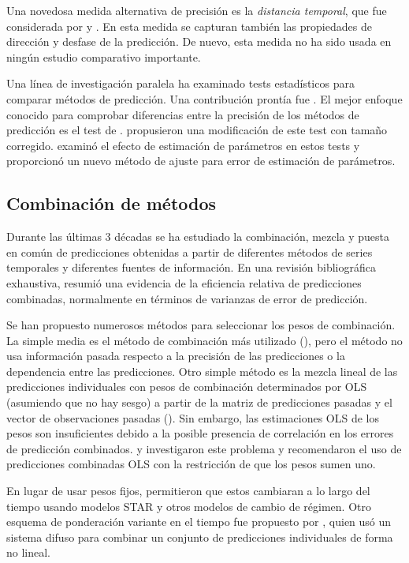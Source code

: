 \documentclass{llncs}
\begin{document}
Una novedosa medida alternativa de precisión es la \emph{distancia temporal}, que fue considerada por \cite{Granger2003199} y \cite{Granger2003339}. En esta medida se capturan también  las propiedades de dirección y desfase de la predicción. De nuevo, esta medida no ha sido usada en ningún estudio comparativo importante.

Una línea de investigación paralela ha examinado tests estadísticos para comparar métodos de predicción. Una contribución prontía fue \cite{Flores1989529}. El mejor enfoque conocido para comprobar diferencias entre la precisión de los métodos de predicción es el test de \cite{Diebold1995253}. \cite{Harvey1997281} propusieron una modificación de este test con tamaño corregido. \cite{McCracken2004503} examinó el efecto de estimación de parámetros en estos tests y proporcionó un nuevo método de ajuste para error de estimación de parámetros.


\subsection{Combinación de métodos}
Durante las últimas 3 décadas se ha estudiado la combinación, mezcla y puesta en común de predicciones obtenidas a partir de diferentes métodos de series temporales y diferentes fuentes de información. En una revisión bibliográfica exhaustiva, \cite{Clemen1989559} resumió una evidencia de la eficiencia relativa de predicciones combinadas, normalmente en términos de varianzas de error de predicción.

Se han propuesto numerosos métodos para seleccionar los pesos de combinación. La simple media es el método de combinación más utilizado (\cite{Bunn1985151}), pero el método no usa información pasada respecto a la precisión de las predicciones o la dependencia entre las predicciones. Otro simple método es la mezcla lineal de las predicciones individuales con pesos de combinación determinados por OLS (asumiendo que no hay sesgo) a partir de la matriz de predicciones pasadas y el vector de observaciones pasadas (\cite{Granger1984197}). Sin embargo, las estimaciones OLS de los pesos son insuficientes debido a la posible presencia de correlación en los errores de predicción combinados. \cite{Aksu199227} y \cite{Gunter199245} investigaron este problema y recomendaron el uso de predicciones combinadas OLS con la restricción de que los pesos sumen uno.

En lugar de usar pesos fijos, \cite{Deutsch199447} permitieron que estos cambiaran a lo largo del tiempo usando modelos STAR y otros modelos de cambio de régimen. Otro esquema de ponderación variante en el tiempo fue propuesto por \cite{Fiordaliso1998367}, quien usó un sistema difuso para combinar un conjunto de predicciones individuales de forma no lineal. 
\end{document}
